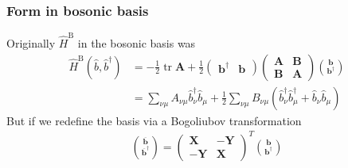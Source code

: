 \begin{frame}
    \frametitle{Form in bosonic basis}
Originally $\hat{H}^{\mathrm{B}}$ in the bosonic basis was
\begin{align}
\hat{H}^{\mathrm{B}}\left(\hat{b}, \hat{b}^{\dagger}\right)&=-\frac{1}{2} \operatorname{tr} \mathbf{A}+\frac{1}{2}\left(\begin{array}{ll}
\mathbf{b}^{\dagger} & \mathbf{b}
\end{array}\right)\left(\begin{array}{ll}
\mathbf{A} & \mathbf{B} \\
\mathbf{B} & \mathbf{A}
\end{array}\right)\binom{\mathbf{b}}{\mathbf{b}^{\dagger}}
\label{eq:rpa_rec}
 \\
&=\sum_{\nu \mu} A_{\nu \mu} \hat{b}_\nu^{\dagger} \hat{b}_\mu+\frac{1}{2} \sum_{\nu \mu} B_{\nu \mu}\left(\hat{b}_\nu^{\dagger} \hat{b}_\mu^{\dagger}+\hat{b}_\nu \hat{b}_\mu\right)
\end{align}
But if we redefine the basis via a Bogoliubov transformation
\begin{align}
\binom{\overline{\mathbf{b}}}{\overline{\mathbf{b}}^{\dagger}}=\left(\begin{array}{cc}
\mathbf{X} & -\mathbf{Y} \\
-\mathbf{Y} & \mathbf{X}
\end{array}\right)^T\binom{\mathbf{b}}{\mathbf{b}^{\dagger}}
\end{align}

\end{frame}


